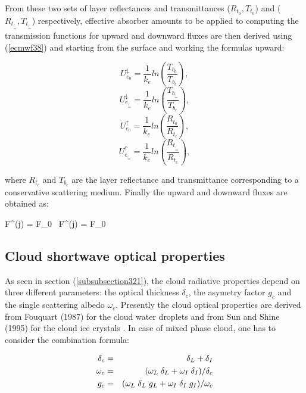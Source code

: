 From these two sets of layer reflectances and transmittances ($R_{t_0},T_{t_0}$)
and ($R_{t_{\not{=}}},T_{t_{\not{=}}}$) respectively, effective absorber amounts
to be applied to computing the transmission functions for upward and downward
fluxes are then derived using (\ref{ecmwf38}) and starting from the surface and
working the formulas upward:

\medskip
\[
U_{e_0}^{\!\downarrow} = \frac{1}{k_e} ln(\frac{T_{b_0}}{T_{b_c}}),
\]
\[
U_{e_{\not{=}}}^{\!\downarrow} = \frac{1}{k_e} ln(\frac{T_{b_{\not{=}}}}{T_{b_c}}),
\]
\be
\label{ecmwf332}
\ee
\[
U_{e_0}^{\!\uparrow} = \frac{1}{k_e} ln(\frac{R_{t_0}}{R_{t_c}}),
\]
\[
U_{e_{\not{=}}}^{\!\uparrow} = \frac{1}{k_e} ln(\frac{R_{t_{\not{=}}}}{R_{t_c}}),
\]
\medskip

\noindent where $R_{t_c}$ and $T_{b_c}$ are the layer reflectance and
transmittance corresponding to a conservative scattering medium.
Finally the upward and downward fluxes are obtained as:

\medskip
\be
F^{\!\uparrow}(j) = F_0 \, \biggl[R_{t_0} \, t_{\Delta\nu}(U_{e_0}^{\!\uparrow}) + (R_{t_{\not{=}}} - R_{t_0}) \, t_{\Delta\nu}U_{e_{\not{=}}}^{\!\uparrow})\biggr]
\label{ecmwf333a}
\ee
\medskip
\be
F^{\!\downarrow}(j) = F_0 \, \biggl[T_{b_0} \, t_{\Delta\nu}(U_{e_0}^{\!\downarrow}) + (T_{b_{\not{=}}} - T_{b_0}) \, t_{\Delta\nu}U_{e_{\not{=}}}^{\!\downarrow})\biggr]
\label{ecmwf333b}
\ee
\medskip

%
\subsection{Cloud shortwave optical properties}
%

As seen in section (\ref{subsubsection321}), the cloud radiative properties
depend on three different parameters: the optical thickness $\delta_c$, the
asymetry factor $g_c$ and the single scattering albedo $\omega_c$. Presently
the cloud optical properties are derived from Fouquart (1987) for the cloud
water droplets and from Sun and Shine (1995) for the cloud ice crystals
\footnotemark
%
. In case of mixed phase cloud, one has
to consider the combination formula:

\medskip
\begin{eqnarray}\label{combination}
\delta_{c} &=& \delta_{L} + \delta_{I} \cr
\omega_{c} &=& (\omega_{L} \; \delta_{L} + \omega_{I} \; \delta_{I})/\delta_{c} \cr
g_c        &=& (\omega_{L} \; \delta_{L} \; g_{L} + \omega_{I} \; \delta_{I} \; g_{I})/\omega_{c}
\end{eqnarray}
\medskip

